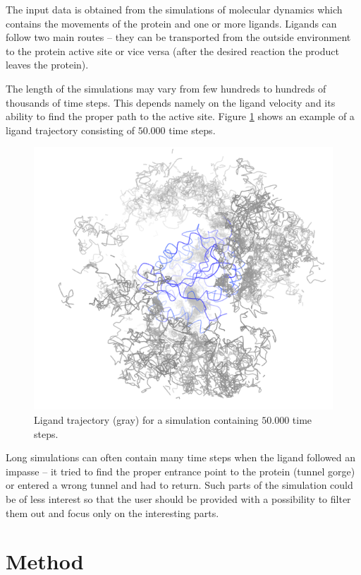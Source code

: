 \documentclass[twocolumn]{bmcart}%
\begin{document}
The input data is obtained from the simulations of molecular dynamics which contains the movements of the protein and one or more ligands.
Ligands can follow two main routes -- they can be transported from the outside environment to the protein active site or vice versa (after the desired reaction the product leaves the protein).

The length of the simulations may vary from few hundreds to hundreds of thousands of time steps.  
This depends namely on the ligand velocity and its ability to find the proper path to the active site.
Figure \ref{fig:lig_movement} shows an example of a ligand trajectory consisting of $50.000$ time steps. 

\begin{figure}[htb]
	\centering
  \includegraphics[width=0.95\linewidth]{img/lig_movement.png}
  \caption{\label{fig:lig_movement} Ligand trajectory (gray) for a simulation containing $50.000$ time steps.}
\end{figure}

Long simulations can often contain many time steps when the ligand followed an impasse -- it tried to find the proper entrance point to the protein (tunnel gorge) or entered a wrong tunnel and had to return.
Such parts of the simulation could be of less interest so that the user should be provided with a possibility to filter them out and focus only on the interesting parts.


\section*{Method}
\end{document}
